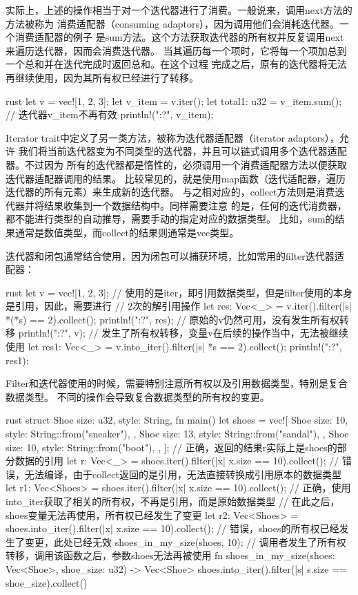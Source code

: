 实际上，上述的操作相当于对一个迭代器进行了消费。一般说来，调用next方法的方法被称为
消费适配器（consuming adaptors），因为调用他们会消耗迭代器。一个消费适配器的例子
是sum方法。这个方法获取迭代器的所有权并反复调用next来遍历迭代器，因而会消费迭代器。
当其遍历每一个项时，它将每一个项加总到一个总和并在迭代完成时返回总和。在这个过程
完成之后，原有的迭代器将无法再继续使用，因为其所有权已经进行了转移。
\begin{code-block}{rust}
let v = vec![1, 2, 3];
let v_item = v.iter();
let total1: u32 = v_item.sum();
// 迭代器v_item不再有效
println!("{:?}", v_item);
\end{code-block}

Iterator trait中定义了另一类方法，被称为迭代器适配器（iterator adaptors），允许
我们将当前迭代器变为不同类型的迭代器，并且可以链式调用多个迭代器适配器。不过因为
所有的迭代器都是惰性的，必须调用一个消费适配器方法以便获取迭代器适配器调用的结果。
比较常见的，就是使用map函数（迭代适配器，遍历迭代器的所有元素）来生成新的迭代器。
与之相对应的，collect方法则是消费迭代器并将结果收集到一个数据结构中。同样需要注意
的是，任何的迭代消费器，都不能进行类型的自动推导，需要手动的指定对应的数据类型。
比如，sum的结果通常是数值类型，而collect的结果则通常是vec类型。

迭代器和闭包通常结合使用，因为闭包可以捕获环境，比如常用的filter迭代器适配器：
\begin{code-block}{rust}
let v = vec![1, 2, 3];
// 使用的是iter，即引用数据类型，但是filter使用的本身是引用，因此，需要进行
// 2次的解引用操作
let res: Vec<_> = v.iter().filter(|s| *(*s) == 2).collect();
println!("{:?}", res);
// 原始的v仍然可用，没有发生所有权转移
println!("{:?}", v);
// 发生了所有权转移，变量v在后续的操作当中，无法被继续使用
let res1: Vec<_> = v.into_iter().filter(|s| *s == 2).collect();
println!("{:?}", res1);
\end{code-block}

Filter和迭代器使用的时候，需要特别注意所有权以及引用数据类型，特别是复合数据类型。
不同的操作会导致复合数据类型的所有权的变更。
\begin{code-block}{rust}
struct Shoe {
    size: u32,
    style: String,
}
fn main() {
    let shoes = vec![
        Shoe {
            size: 10,
            style: String::from("sneaker"),
        },
        Shoe {
            size: 13,
            style: String::from("sandal"),
        },
        Shoe {
            size: 10,
            style: String::from("boot"),
        },
    ];
    // 正确，返回的结果r实际上是shoes的部分数据的引用
    let r: Vec<_> = shoes.iter().filter(|x| x.size == 10).collect();
    // 错误，无法编译，由于collect返回的是引用，无法直接转换成引用原本的数据类型
    let r1: Vec<Shoes> = shoes.iter().filter(|x| x.size == 10).collect();
    // 正确，使用into_iter获取了相关的所有权，不再是引用，而是原始数据类型
    // 在此之后，shoes变量无法再使用，所有权已经发生了变更
    let r2: Vec<Shoes> = shoes.into_iter().filter(|x| x.size == 10).collect();
    // 错误，shoes的所有权已经发生了变更，此处已经无效
    shoes_in_my_size(shoes, 10);
}
// 调用者发生了所有权转移，调用该函数之后，参数shoes无法再被使用
fn shoes_in_my_size(shoes: Vec<Shoe>, shoe_size: u32) -> Vec<Shoe> {
    shoes.into_iter().filter(|s| s.size == shoe_size).collect()
}
\end{code-block}

